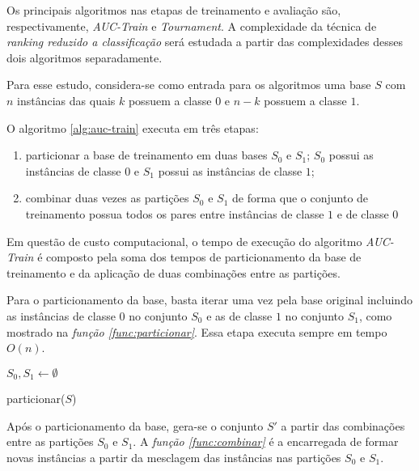 Os principais algoritmos nas etapas de treinamento e avaliação são, respectivamente, \emph{AUC-Train} e \emph{Tournament}. A complexidade da técnica de \emph{ranking reduzido a classificação} será estudada a partir das complexidades desses dois algoritmos separadamente.

Para esse estudo, considera-se como entrada para os algoritmos uma base $S$ com $n$ instâncias das quais $k$ possuem a classe $0$ e $n - k$ possuem a classe $1$.

O algoritmo \ref{alg:auc-train} executa em três etapas:

\begin{enumerate}
    \item particionar a base de treinamento em duas bases $S_0$ e $S_1$; $S_0$ possui as instâncias de classe $0$ e $S_1$ possui as instâncias de classe $1$;
    \item combinar duas vezes as partições $S_0$ e $S_1$ de forma que o conjunto de treinamento possua todos os pares entre instâncias de classe $1$ e de classe $0$
\end{enumerate}

Em questão de custo computacional, o tempo de execução do algoritmo \emph{AUC-Train} é composto pela soma dos tempos de particionamento da base de treinamento e da aplicação de duas combinações entre as partições.

Para o particionamento da base, basta iterar uma vez pela base original incluindo as instâncias de classe $0$ no conjunto $S_0$ e as de classe $1$ no conjunto $S_1$, como mostrado na \emph{função \ref{func:particionar}}. Essa etapa executa sempre em tempo $O(n)$.

\begin{function}

        $S_0, S_1 \gets \emptyset$



    \caption{particionar($S$)}
    \label{func:particionar}
\end{function}

Após o particionamento da base, gera-se o conjunto $S'$ a partir das combinações entre as partições $S_0$ e $S_1$. A \emph{função \ref{func:combinar}} é a encarregada de formar novas instâncias a partir da mesclagem das instâncias nas partições $S_0$ e $S_1$.

